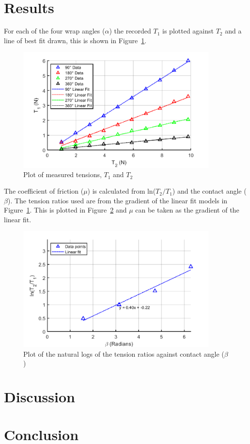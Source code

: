 \documentclass[a4paper,12pt]{article}
\begin{document}
\break

\section{Results}
For each of the four wrap angles ($\alpha$) the recorded $T_1$ is plotted against $T_2$ and a line of best fit drawn, this is shown in Figure~\ref{fig:fig1}.

\begin{figure}[h]
    \centering
    \includegraphics[width=0.9\textwidth]{figures/fig1.png}
    \caption{Plot of measured tensions, $T_1$ and $T_2$}
    \label{fig:fig1}
\end{figure}

The coefficient of friction ($\mu$) is calculated from ln($T_2/T_1$) and the contact angle ($\beta$). The tension ratios used are from the gradient of the linear fit models in Figure~\ref{fig:fig1}. This is plotted in Figure~\ref{fig:fig2} and $\mu$ can be taken as the gradient of the linear fit.

\begin{figure}[h]
    \centering
    \includegraphics[width=0.9\textwidth]{figures/fig2.png}
    \caption{Plot of the natural logs of the tension ratios against contact angle ($\beta$)}
    \label{fig:fig2}
\end{figure}

\break

\section{Discussion}



\section{Conclusion}

\newrefcontext[sorting=nyt]
\printbibliography
\end{document}

